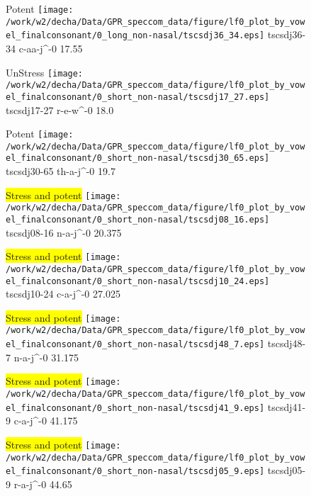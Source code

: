 \documentclass{article}
\begin{document}
\begin{figure}[t]
\begin{minipage}[b]{.24\textwidth}
\colorbox{Apricot}{Potent}
\centering
\texttt{[image: /work/w2/decha/Data/GPR\_speccom\_data/figure/lf0\_plot\_by\_vowel\_finalconsonant/0\_long\_non-nasal/tscsdj36\_34.eps]}
tscsdj36-34 c-aa-j\textasciicircum-0 17.55
\end{minipage}
\begin{minipage}[b]{.24\textwidth}
UnStress
\centering
\texttt{[image: /work/w2/decha/Data/GPR\_speccom\_data/figure/lf0\_plot\_by\_vowel\_finalconsonant/0\_short\_non-nasal/tscsdj17\_27.eps]}
tscsdj17-27 r-e-w\textasciicircum-0 18.0
\end{minipage}
\begin{minipage}[b]{.24\textwidth}
\colorbox{Apricot}{Potent}
\centering
\texttt{[image: /work/w2/decha/Data/GPR\_speccom\_data/figure/lf0\_plot\_by\_vowel\_finalconsonant/0\_short\_non-nasal/tscsdj30\_65.eps]}
tscsdj30-65 th-a-j\textasciicircum-0 19.7
\end{minipage}
\begin{minipage}[b]{.24\textwidth}
\colorbox{yellow}{Stress and potent}
\centering
\texttt{[image: /work/w2/decha/Data/GPR\_speccom\_data/figure/lf0\_plot\_by\_vowel\_finalconsonant/0\_short\_non-nasal/tscsdj08\_16.eps]}
tscsdj08-16 n-a-j\textasciicircum-0 20.375
\end{minipage}
\end{figure}

\begin{figure}[t]
\begin{minipage}[b]{.24\textwidth}
\colorbox{yellow}{Stress and potent}
\centering
\texttt{[image: /work/w2/decha/Data/GPR\_speccom\_data/figure/lf0\_plot\_by\_vowel\_finalconsonant/0\_short\_non-nasal/tscsdj10\_24.eps]}
tscsdj10-24 c-a-j\textasciicircum-0 27.025
\end{minipage}
\begin{minipage}[b]{.24\textwidth}
\colorbox{yellow}{Stress and potent}
\centering
\texttt{[image: /work/w2/decha/Data/GPR\_speccom\_data/figure/lf0\_plot\_by\_vowel\_finalconsonant/0\_short\_non-nasal/tscsdj48\_7.eps]}
tscsdj48-7 n-a-j\textasciicircum-0 31.175
\end{minipage}
\begin{minipage}[b]{.24\textwidth}
\colorbox{yellow}{Stress and potent}
\centering
\texttt{[image: /work/w2/decha/Data/GPR\_speccom\_data/figure/lf0\_plot\_by\_vowel\_finalconsonant/0\_short\_non-nasal/tscsdj41\_9.eps]}
tscsdj41-9 c-a-j\textasciicircum-0 41.175
\end{minipage}
\begin{minipage}[b]{.24\textwidth}
\colorbox{yellow}{Stress and potent}
\centering
\texttt{[image: /work/w2/decha/Data/GPR\_speccom\_data/figure/lf0\_plot\_by\_vowel\_finalconsonant/0\_short\_non-nasal/tscsdj05\_9.eps]}
tscsdj05-9 r-a-j\textasciicircum-0 44.65
\end{minipage}
\end{figure}
\end{document}
